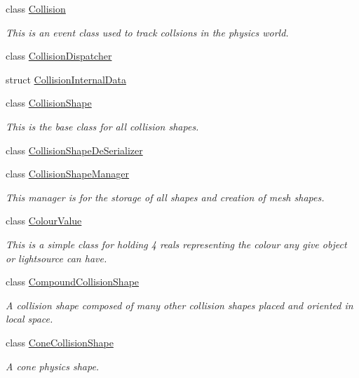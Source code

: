 \begin{DoxyCompactItemize}
class \hyperlink{classMezzanine_1_1Collision}{Collision}
\begin{DoxyCompactList}\small\item\em This is an event class used to track collsions in the physics world. \item\end{DoxyCompactList}\item 
class \hyperlink{classMezzanine_1_1CollisionDispatcher}{CollisionDispatcher}
\item 
struct \hyperlink{structMezzanine_1_1CollisionInternalData}{CollisionInternalData}
\item 
class \hyperlink{classMezzanine_1_1CollisionShape}{CollisionShape}
\begin{DoxyCompactList}\small\item\em This is the base class for all collision shapes. \item\end{DoxyCompactList}\item 
class \hyperlink{classMezzanine_1_1CollisionShapeDeSerializer}{CollisionShapeDeSerializer}
\item 
class \hyperlink{classMezzanine_1_1CollisionShapeManager}{CollisionShapeManager}
\begin{DoxyCompactList}\small\item\em This manager is for the storage of all shapes and creation of mesh shapes. \item\end{DoxyCompactList}\item 
class \hyperlink{classMezzanine_1_1ColourValue}{ColourValue}
\begin{DoxyCompactList}\small\item\em This is a simple class for holding 4 reals representing the colour any give object or lightsource can have. \item\end{DoxyCompactList}\item 
class \hyperlink{classMezzanine_1_1CompoundCollisionShape}{CompoundCollisionShape}
\begin{DoxyCompactList}\small\item\em A collision shape composed of many other collision shapes placed and oriented in local space. \item\end{DoxyCompactList}\item 
class \hyperlink{classMezzanine_1_1ConeCollisionShape}{ConeCollisionShape}
\begin{DoxyCompactList}\small\item\em A cone physics shape. \item\end{DoxyCompactList}\item 

\end{DoxyCompactItemize}
